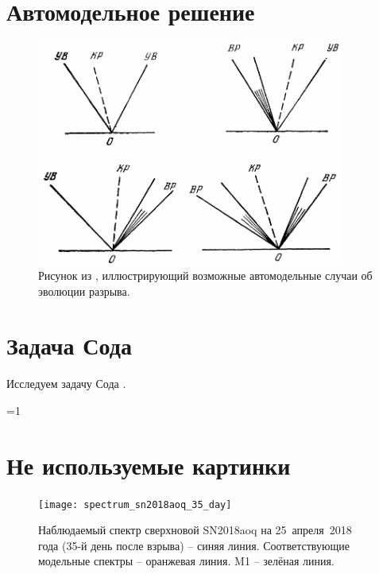 \documentclass[a4paper,12pt]{extarticle}
\newcounter{basement}
\begin{document}
\section{Автомодельное решение}




%
\begin{figure}[!htb]
	\centering
	\includegraphics[width=0.9\textwidth]{godunov1976_fig13-1}
	\caption{
		Рисунок из \cite{godunov1976}, иллюстрирующий возможные автомодельные случаи об эволюции разрыва.
	}
	\label{fig:godunov1976_fig13-1}
\end{figure}


\section{Задача Сода }

Исследуем задачу Сода \cite{sod1978}.




\clearpage
\sloppy
\printbibliography


\ifnum \value{basement}=1

\newpage


\section*{Не используемые картинки}


%
\begin{figure}[!htb]
	\centering
	\texttt{[image: spectrum\_sn2018aoq\_35\_day]}
	\caption{
		Наблюдаемый спектр сверхновой SN2018aoq
		на 25~апреля~2018 года (35-й день после взрыва) -- синяя линия.
		Соответствующие модельные спектры
		\tardis -- оранжевая линия.
		M1 -- зелёная линия.
	}
	\label{fig:spectrum_sn2018aoq_35_day}
\end{figure}

\fi
\end{document}
